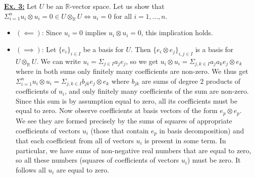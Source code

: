 \documentclass[a4paper, 12pt]{article}
\newcommand{\R}{\mathbb{R}}
\begin{document}
\underline{\textbf{Ex. 3:}}
Let $U$ be an $\R$-vector space. Let us show that $\Sigma_{i = 1}^n u_i\otimes u_i = 0 \in U\otimes_\R U \iff u_i = 0$ for all $i = 1, \dots, n$.
\begin{itemize}
	\item $(\impliedby)$: Since $u_i = 0$ implies $u_i \otimes u_i = 0$, this implication holds.
	\item $(\implies)$: Let $\lbrace e_i \rbrace_{i \in I}$ be a basis for $U$. Then $\lbrace e_i \otimes e_j \rbrace_{i, j \in I}$ is a basis for $U \otimes_\R U$. We can write $u_i = \Sigma_{j \in I} a_je_j$, so we get $u_i \otimes u_i = \Sigma_{j, k \in I} a_ja_k e_j \otimes e_k$ where in both sums only finitely many coefficients are non-zero. We thus get $\Sigma_{i =1}^n u_i \otimes u_i = \Sigma_{j, k \in I} b_{jk} e_j \otimes e_k$ where $b_{jk}$ are sums of degree $2$ products of coefficients of $u_i$, and only finitely many coefficients of the sum are non-zero. Since this sum is by assumption equal to zero, all its coefficients must be equal to zero. Now observe coefficients at basis vectors of the form $e_p \otimes e_p$. We see they are formed precisely by the sums of squares of appropriate coefficients of vectors $u_i$ (those that contain $e_p$ in basis decomposition) and that each coefficient from all of vectors $u_i$ is present in some term. In particular, we have sums of non-negative real numbers that are equal to zero, so all these numbers (squares of coefficients of vectors $u_i$) must be zero. It follows all $u_i$ are equal to zero. %
\end{itemize}
\end{document}
